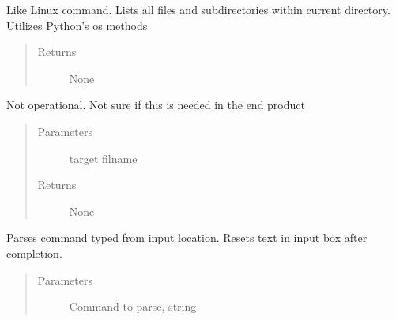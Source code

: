 \documentclass[letterpaper,10pt,english]{sphinxmanual}
\begin{document}
\begin{fulllineitems}
\begin{fulllineitems}
\end{fulllineitems}


\begin{fulllineitems}
\label{\detokenize{index:HDF5Browser.FileBrowser.__ls}}
\sphinxAtStartPar
Like Linux command. Lists all files and subdirectories within current directory. Utilizes Python’s os methods
\begin{quote}\begin{description}
\item[{Returns}] \leavevmode
\sphinxAtStartPar
None

\end{description}\end{quote}

\end{fulllineitems}


\begin{fulllineitems}
\label{\detokenize{index:HDF5Browser.FileBrowser.__outputTree}}
\sphinxAtStartPar
Not operational. Not sure if this is needed in the end product
\begin{quote}\begin{description}
\item[{Parameters}] \leavevmode
\sphinxAtStartPar
{} \textendash{} target filname

\item[{Returns}] \leavevmode
\sphinxAtStartPar
None

\end{description}\end{quote}

\end{fulllineitems}


\begin{fulllineitems}
\label{\detokenize{index:HDF5Browser.FileBrowser.__parseCommand}}
\sphinxAtStartPar
Parses command typed from input location. Resets text in input box after completion.
\begin{quote}\begin{description}
\item[{Parameters}] \leavevmode
\sphinxAtStartPar
{} \textendash{} Command to parse, string


\end{description}
\end{quote}
\end{fulllineitems}
\end{fulllineitems}
\end{document}
